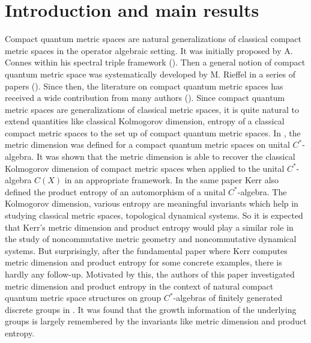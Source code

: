 \documentclass[a4paper,11pt,reqno]{amsart}
\theoremstyle{plain}
\theoremstyle{mainthmstyle}
\theoremstyle{named}
\numberwithin{equation}{section}
\begin{document}
\section{Introduction and main results}
Compact quantum metric spaces are natural generalizations of classical compact metric spaces in the operator algebraic setting. It was initially proposed by A. Connes within his spectral triple framework (\cite{Connes1}). Then a general notion of compact quantum metric space was systematically developed by M. Rieffel in a series of papers (\cites{Rieffel2, Rieffel-1998-Metrics-on-state-from-action-of-cmpt-gp, Rieffel-2002-Group-C-alg-as-compact-quan-metr-sp, Rieffel1}). Since then, the literature on compact quantum metric spaces has received a wide contribution from many authors (\cites{Christensen, Long-Wu-2017-Twisted-group-C-alg-as-CQMS, latremoliere2013quantum, latremoliere2015quantum, latremoliere2016quantum, latremoliere2020convergence, latremoliere2022gromov, aguilar2023domains, MR2504529}). Since compact quantum metric spaces are generalizations of classical metric spaces, it is quite natural to extend quantities like classical Kolmogorov dimension, entropy of a classical compact metric spaces to the set up of compact quantum metric spaces. In \cite{Kerr}, the metric dimension was defined for a compact quantum metric spaces on unital $C^{\ast}$-algebra. It was shown that the metric dimension is able to recover the classical Kolmogorov dimension of compact metric spaces when applied to the unital $C^{\ast}$-algebra $C(X)$ in an appropriate framework. In the same paper Kerr also defined the product entropy of an automorphism of a unital $C^{\ast}$-algebra. The Kolmogorov dimension, various entropy are meaningful invariants which help in studying classical metric spaces, topological dynamical systems. So it is expected that Kerr's metric dimension and product entropy would play a similar role in the study of noncommutative metric geometry and noncommutative dynamical systems. But surprisingly, after the fundamental paper where Kerr computes metric dimension and product entropy for some concrete examples, there is hardly any follow-up. Motivated by this, the authors of this paper investigated metric dimension and product entropy in the context of natural compact quantum metric space structures on group $C^{\ast}$-algebras of finitely generated discrete groups in \cite{chattopadhyay2026metric}. It was found that the growth information of the underlying groups is largely remembered by the invariants like metric dimension and product entropy. \\
\end{document}
